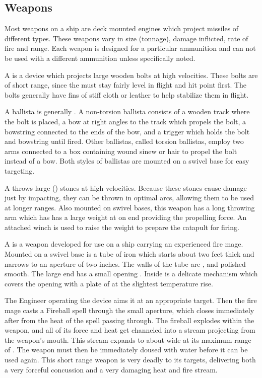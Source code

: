\begin{multicols*}{2}
\subsection{Weapons}
Most weapons on a ship are deck mounted engines which project missiles of different types. These weapons vary in size (tonnage), damage inflicted, rate of fire and range. Each weapon is designed for a particular ammunition and can not be used with a different ammunition unless specifically noted.

A  is a device which projects large wooden bolts at high velocities. These bolts are of short range, since the must stay fairly level in flight and hit point first. The bolts generally have fins of stiff cloth or leather to help stabilize them in flight.

A ballista is generally . A non-torsion ballista consists of a wooden track where the bolt is placed, a bow at right angles to the track which propels the bolt, a bowstring connected to the ends of the bow, and a trigger which holds the bolt and bowstring until fired. Other ballistas, called torsion ballistas, employ two arms connected to a box containing wound sinew or hair to propel the bolt instead of a bow. Both styles of ballistas are mounted on a swivel base for easy targeting.

A  throws large () stones at high velocities. Because these stones cause damage just by impacting, they can be thrown in optimal arcs, allowing them to be used at longer ranges. Also mounted on swivel bases,
this weapon has a long throwing arm which has has a large weight at on end providing the propelling force. An attached winch is used to raise the weight to prepare the catapult for firing.

A  is a weapon developed for use on a ship carrying an experienced fire mage. Mounted on a swivel base is a  tube of iron which starts about two feet thick and narrows to an aperture of two inches. The walls of the tube are , and polished smooth. The large end has a small opening . Inside is a delicate mechanism which covers the opening with a plate of  at the slightest temperature rise.

The Engineer operating the device aims it at an appropriate target. Then the fire mage casts a Fireball spell through the small aperture, which closes immediately after from the heat of the spell passing through. The fireball explodes within the weapon, and all of its force and heat get channeled into a  stream projecting from the weapon's mouth. This stream expands to about  wide at its maximum range of . The weapon must then be immediately doused with water before it can be used again. This short range weapon is very deadly to its targets, delivering both a very forceful concussion and a very damaging heat and fire stream. 


\end{multicols*}
